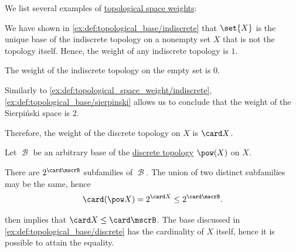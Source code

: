 \begin{example}\label{ex:def:topological_space_weight}
  We list several examples of \hyperref[def:topological_space_weight]{topological space weights}:
  \begin{thmenum}
     We have shown in \cref{ex:def:topological_base/indiscrete} that \( \set{ X } \) is the unique base of the indiscrete topology on a nonempty set \( X \) that is not the topology itself. Hence, the weight of any indiscrete topology is \( 1 \).

    The weight of the indiscrete topology on the empty set is \( 0 \).

     Similarly to \cref{ex:def:topological_space_weight/indiscrete}, \cref{ex:def:topological_base/sierpinski} allows us to conclude that the weight of the Sierpi\'nski space is \( 2 \).

     Therefore, the weight of the discrete topology on \( X \) is \( \card X \).

    Let \( \mscrB \) be an arbitrary base of the \hyperref[def:discrete_topology]{discrete topology} \( \pow(X) \) on \( X \).

    There are \( 2^{\card \mscrB} \) subfamilies of \( \mscrB \). The union of two distinct subfamilies may be the same, hence
    \begin{equation*}
      \card(\pow X) = 2^{\card X} \leq 2^{\card \mscrB}.
    \end{equation*}

     then implies that \( \card X \leq \card \mscrB \). The base discussed in \cref{ex:def:topological_base/discrete} has the cardinality of \( X \) itself, hence it is possible to attain the equality.
  \end{thmenum}
\end{example}

